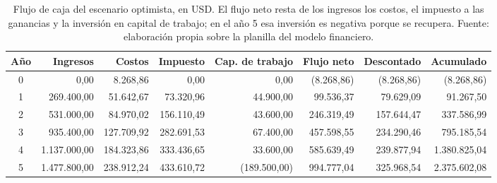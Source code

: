 \begin{table}[t]
  \centering
  \footnotesize\setlength{\tabcolsep}{3.5pt}
  \caption{Flujo de caja del escenario optimista, en USD. El flujo neto resta de los ingresos los costos, el impuesto a las ganancias y la inversión en capital de trabajo; en el año 5 esa inversión es negativa porque se recupera. Fuente: elaboración propia sobre la planilla del modelo financiero.}
  \label{tab:financiero-optimista-flujo}
  \begin{tabular}{c r r r r r r r}
    \hline
    \textbf{Año} & \textbf{Ingresos} & \textbf{Costos} & \textbf{Impuesto} & \textbf{Cap. de trabajo} & \textbf{Flujo neto} & \textbf{Descontado} & \textbf{Acumulado} \\
    \hline
    0 & 0,00 & 8.268,86 & 0,00 & 0,00 & (8.268,86) & (8.268,86) & (8.268,86) \\
    1 & 269.400,00 & 51.642,67 & 73.320,96 & 44.900,00 & 99.536,37 & 79.629,09 & 91.267,50 \\
    2 & 531.000,00 & 84.970,02 & 156.110,49 & 43.600,00 & 246.319,49 & 157.644,47 & 337.586,99 \\
    3 & 935.400,00 & 127.709,92 & 282.691,53 & 67.400,00 & 457.598,55 & 234.290,46 & 795.185,54 \\
    4 & 1.137.000,00 & 184.323,86 & 333.436,65 & 33.600,00 & 585.639,49 & 239.877,94 & 1.380.825,04 \\
    5 & 1.477.800,00 & 238.912,24 & 433.610,72 & (189.500,00) & 994.777,04 & 325.968,54 & 2.375.602,08 \\
    \hline
  \end{tabular}
\end{table}
